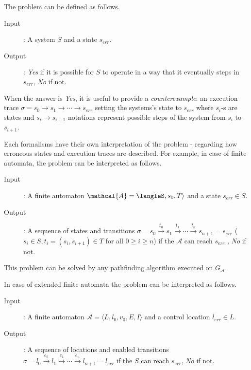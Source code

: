 The problem can be defined as follows.
\begin{description}
	\item[Input]: A system $S$ and a state $s_{err}$.
	\item[Output]: \emph{Yes} if it is possible for $S$ to operate in a way that it eventually steps in $s_{err}$, \emph{No} if not.
\end{description}

When the answer is \emph{Yes}, it is useful to provide a \emph{counterexample}: an execution trace $\sigma = s_0 \to s_1 \to \cdots \to s_{err}$ setting the systems's state to $s_{err}$ where $s_i$-s are states  and $s_i \to s_{i+1}$ notations represent possible steps of the system from $s_i$ to $s_{i+1}$.

Each formalisms have their own interpretation of the problem - regarding how erroneous states and execution traces are described. For example, in case of finite automata, the problem can be interpreted as follows. 

\begin{description}
	\item[Input]: A finite automaton $\mathcal{A}=\langleS,s_0,T\rangle$ and a state $s_{err} \in S$.
	\item[Output]: A sequence of states and transitions $\sigma = s_0 \xrightarrow{t_0} s_1 \xrightarrow{t_1} \cdots \xrightarrow{t_n} s_{n+1}=s_{err}$ ($s_i \in S, t_i=(s_i,s_{i+1}) \in T$ for all $0 \geq i \geq n$) if the $\mathcal{A}$ can reach $s_{err}$ , \emph{No} if not.
\end{description}

This problem can be solved by any pathfinding algorithm executed on $G_\mathcal{A}$.

\begin{example}
\end{example}

In case of extended finite automata the problem can be interpreted as follows.
\begin{description}
	\item[Input]: A finite automaton $\mathcal{A}=\langle L,l_0,v_0, E, I\rangle$ and a control location $l_{err} \in L$.
	\item[Output]: A sequence of locations and enabled transitions $\sigma = l_0 \xrightarrow{e_0} l_1 \xrightarrow{e_1} \cdots \xrightarrow{e_n} l_{n+1}=l_{err}$ if the $S$ can reach $s_{err}$, \emph{No} if not.
\end{description}


